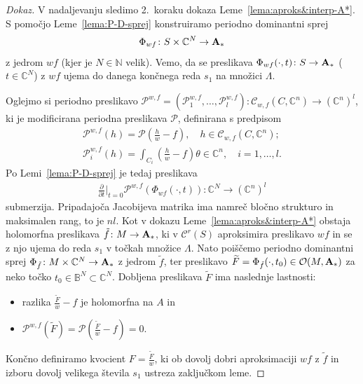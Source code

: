 \documentclass[12pt,a4paper,twoside]{article}
\theoremstyle{definition} %
\newenvironment{dokaz}[1][Dokaz]{\begin{proof}[#1]}{\end{proof}}
\theoremstyle{plain} %
\numberwithin{equation}{section}  %
\newcommand{\C}{\mathbb C}
\begin{document}
\begin{dokaz}
V nadaljevanju sledimo 2.~koraku dokaza Leme~\ref{lema:aproks&interp-A*}. S pomočjo Leme~\ref{lema:P-D-sprej} konstruiramo periodno dominantni sprej
\begin{gather*}
\Phi_{wf} \colon S \times \mathbb{C}^{N} \to \textup{\textbf{A}}_{*}
\end{gather*}
z jedrom $wf$ (kjer je $N \in \mathbb{N}$ velik). Vemo, da se preslikava $\Phi_{wf}(\cdot,t) \colon S \to \textup{\textbf{A}}_{*}$ ($t \in \mathbb{C}^{N}$) z $wf$ ujema do danega končnega reda $s_1$ na množici $\Lambda$.

Oglejmo si periodno preslikavo 
$\mathcal{P}^{w,f} = (\mathcal{P}_{1}^{w,f}, \dots , \mathcal{P}_{l}^{w,f}) \colon \mathcal{C}_{w,f}(C, \mathbb{C}^{n}) \to (\mathbb{C}^{n})^{l}$,
ki je modificirana periodna preslikava $\mathcal{P}$, definirana s predpisom
\begin{gather*}
\mathcal{P}^{w,f}(h) = \mathcal{P} \left(\frac{h}{w}-f \right), \quad h \in \mathcal{C}_{w,f}(C, \mathbb{C}^{n}); \\
\mathcal{P}_{i}^{w,f}(h) = \int_{C_{i}} \left( \frac{h}{w}-f \right) \theta \in \mathbb{C}^{n}, \quad i = 1, \dots , l.
\end{gather*}
Po Lemi~\ref{lema:P-D-sprej} je tedaj preslikava 
\begin{gather*}
 \frac{\partial}{\partial t} \Big|_{t=0} \mathcal{P}^{w,f}(\Phi_{wf}(\cdot, t)) \colon \C^{N} \to (\C^{n})^{l}
\end{gather*}
submerzija. Pripadajoča Jacobijeva matrika ima namreč bločno strukturo in maksimalen rang, to je $nl$.
Kot v dokazu Leme~\ref{lema:aproks&interp-A*} obstaja holomorfna preslikava $\tilde{f} \colon M \to \textup{\textbf{A}}_{*}$, ki v $\mathcal{C}^{r}(S)$ aproksimira preslikavo $wf$ in se z njo ujema do reda $s_1$ v točkah množice $\Lambda$.
Nato poiščemo periodno dominantni sprej $\Phi_{\tilde{f}} \colon M \times \C^{N} \to \textup{\textbf{A}}_{*}$ z jedrom $\tilde{f}$, ter preslikavo 
$\widetilde{F} = \Phi_{\tilde{f}}(\cdot, t_0) \in \mathcal{O}(M, \textup{\textbf{A}}_{*})$ za neko točko $t_0 \in \mathbb{B}^{N} \subset \C^{N}$. 
Dobljena preslikava $\widetilde{F}$ ima naslednje lastnosti:
\begin{itemize}
\item razlika $\frac{\widetilde{F}}{w}-f$ je holomorfna na $A$ in
\item $\mathcal{P}^{w,f}(\widetilde{F}) = \mathcal{P} \left(\frac{\widetilde{F}}{w}-f \right) = 0$.
\end{itemize}
Končno definiramo kvocient $F = \frac{\widetilde{F}}{w}$, ki ob dovolj dobri aproksimaciji $wf$ z $\tilde{f}$ in izboru dovolj velikega števila $s_1$ ustreza zaključkom leme.
\end{dokaz}
\end{document}

